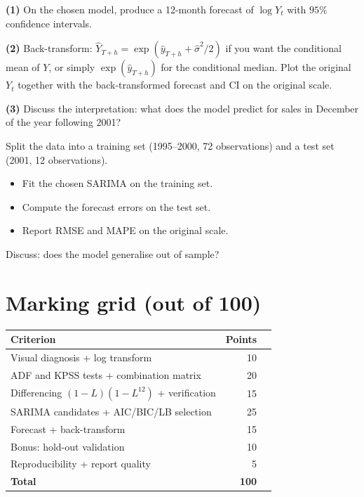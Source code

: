 \documentclass[a4paper,11pt]{article}
\begin{document}
\begin{exercise}
\textbf{(1)} On the chosen model, produce a 12-month forecast of
$\log Y_t$ with $95\%$ confidence intervals.

\textbf{(2)} Back-transform: $\widehat Y_{T+h} = \exp(\widehat
y_{T+h} + \widehat\sigma^2/2)$ if you want the conditional mean of
$Y$, or simply $\exp(\widehat y_{T+h})$ for the conditional median.
Plot the original $Y_t$ together with the back-transformed forecast
and CI on the original scale.

\textbf{(3)} Discuss the interpretation: what does the model predict
for sales in December of the year following 2001?
\end{exercise}

\begin{exercise}
Split the data into a training set (1995--2000, 72 observations) and
a test set (2001, 12 observations).
\begin{itemize}
  \item Fit the chosen SARIMA on the training set.
  \item Compute the forecast errors on the test set.
  \item Report RMSE and MAPE on the original scale.
\end{itemize}
Discuss: does the model generalise out of sample?
\end{exercise}

\section*{Marking grid (out of 100)}

\begin{center}
\begin{tabular}{p{8cm}rl}
\toprule
\textbf{Criterion} & \textbf{Points} & \\
\midrule
Visual diagnosis + log transform              & 10 \\
ADF and KPSS tests + combination matrix       & 20 \\
Differencing $(1-L)(1-L^{12})$ + verification & 15 \\
SARIMA candidates + AIC/BIC/LB selection      & 25 \\
Forecast + back-transform                     & 15 \\
Bonus: hold-out validation                    & 10 \\
Reproducibility + report quality              &  5 \\
\midrule
\textbf{Total}                                & \textbf{100} \\
\bottomrule
\end{tabular}
\end{center}

\bigskip
\hfill\auteurNom\par
\hfill\auteurEmail\par
\end{document}
